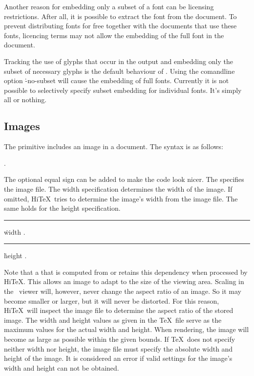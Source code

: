 Another reason for embedding
only a subset of a font can be licensing restrictions. After all, it is possible
to extract the font from the document. To prevent distributing fonts for free together
with the documents that use these fonts, licencing terms may not allow the embedding
of the full font in the document.

Tracking the use of glyphs that occur in the output and embedding only the subset
of necessary glyphs is the default behaviour of \HiTeX. Using the comandline
option \.{-no-subset} will cause the embedding of full fonts. Currently it is not
possible to selectively specify subset embedding for individual fonts. It's simply
all or nothing.


\subsection{Images}
The primitive 
includes an image in a document.
The syntax is as follows:

\medskip
\prim{}  \opt{\.{=}} 
 . 
\medskip

The optional equal sign can be added to make the code look nicer.
The  specifies the image file.
The width specification determines the width of the image. If omitted,
Hi\TeX\ tries to determine the image's width from the image file.
The same holds for the height specification.

\medskip
\rule {}:\.{width} .
\rule {}:\.{height} .
\medskip

Note that a  that is computed from 
or  retains this dependency when processed by Hi\TeX.
This allows an image to adapt to the size of the viewing area.
Scaling in the \HINT\ viewer will, however, never change the
aspect ratio of an image. So it may become smaller or larger,
but it will never be distorted.
For this reason, Hi\TeX\ will inspect the image file to determine the
aspect ratio of the stored image.
The width and height values as given in the \TeX\ file serve
as the maximum values for the actual width and height. When rendering,
the image will become as large as possible within the given bounds.
If \TeX\ does not specify neither width nor height, the image file
must specify the absolute width and height of the image.
It is considered an error if valid settings for the image's width and height
can not be obtained.

